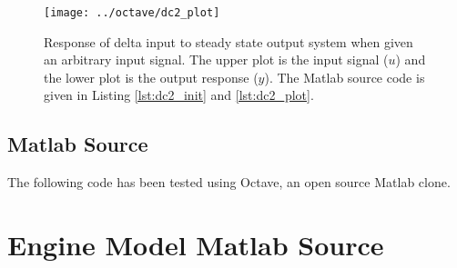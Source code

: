 \documentclass{article}
\begin{document}
\begin{figure}[htbp!]
\texttt{[image: ../octave/dc2\_plot]}
\caption{Response of delta input to steady state output system
when given an arbitrary input signal.
The upper plot is the input signal ($u$) and the lower plot is
the output response ($y$).
The Matlab source code is given in Listing \ref{lst:dc2_init}
and \ref{lst:dc2_plot}.
}
\label{fig:dc2_plot}
\end{figure}

\clearpage
\subsection{Matlab Source}
\label{app:dcsrc}

The following code has been tested using Octave\autocite{octave},
an open source Matlab clone.

%
%
%






\clearpage
\section{Engine Model Matlab Source}
\label{app:em_matlab}
\label{app:rpmtime_plot_source}





\clearpage


\clearpage

\end{document}
